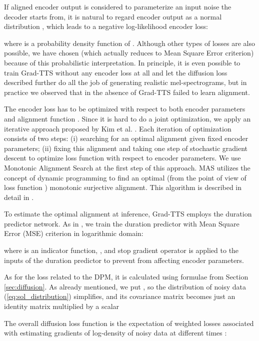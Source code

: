 \documentclass{article}
\begin{document}
If aligned encoder output  is considered to parameterize an input noise the decoder starts from, it is natural to regard encoder output  as a normal distribution , which leads to a negative log-likelihood encoder loss:



where  is a probability density function of . Although other types of losses are also possible, we have chosen  (which actually reduces to Mean Square Error criterion) because of this probabilistic interpretation. In principle, it is even possible to train Grad-TTS without any encoder loss at all and let the diffusion loss described further do all the job of generating realistic mel-spectrograms, but in practice we observed that in the absence of  Grad-TTS failed to learn alignment.

The encoder loss  has to be optimized with respect to both encoder parameters and alignment function . Since it is hard to do a joint optimization, we apply an iterative approach proposed by Kim et al. . Each iteration of optimization consists of two steps: (i) searching for an optimal alignment  given fixed encoder parameters; (ii) fixing this alignment  and taking one step of stochastic gradient descent to optimize loss function with respect to encoder parameters. We use Monotonic Alignment Search at the first step of this approach. MAS utilizes the concept of dynamic programming to find an optimal (from the point of view of loss function ) monotonic surjective alignment. This algorithm is described in detail in \cite{GlowTTS}.

To estimate the optimal alignment  at inference, Grad-TTS employs the duration predictor network. As in \cite{GlowTTS}, we train the duration predictor  with Mean Square Error (MSE) criterion in logarithmic domain:



where  is an indicator function, ,  and stop gradient operator  is applied to the inputs of the duration predictor to prevent  from affecting encoder parameters.

As for the loss related to the DPM, it is calculated using formulae from Section \ref{sec:diffusion}. As already mentioned, we put , so the distribution of noisy data (\ref{eq:sol_distribution}) simplifies, and its covariance matrix becomes just an identity matrix  multiplied by a scalar



The overall diffusion loss function  is the expectation of weighted losses associated with estimating gradients of log-density of noisy data at different times :
\end{document}
